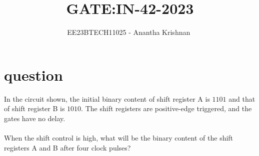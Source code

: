 \documentclass[journal,12pt,onecolumn]{IEEEtran}
\theoremstyle{remark}
\begin{document}

\vspace{3cm}

\title{GATE:IN-42-2023}
\author{EE23BTECH11025 - Anantha Krishnan $^{}$%
}
\maketitle
\bigskip



\section{question}
In the circuit shown, the initial binary content of shift register A is $1101$ and that of shift register B is $1010$. The shift registers are positive-edge triggered, and the gates have no delay.\\
\\
When the shift control is high, what will be the binary content of the shift registers A and B after four clock pulses?\\
\end{document}
